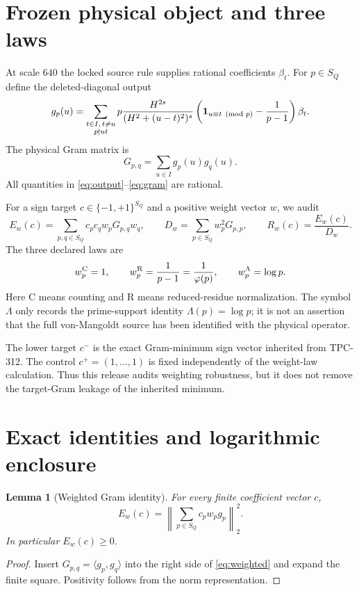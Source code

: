 \documentclass[10pt,a4paper]{article}
\newtheorem{lemma}{Lemma}
\begin{document}
\section{Frozen physical object and three laws}

At scale $640$ the locked source rule supplies rational coefficients
$\beta_t$.  For $p\in S_Q$ define the deleted-diagonal output
\begin{equation}
 g_p(u)=\sum_{\substack{t\in I,\, t\ne u\\p\nmid ut}}
 p\frac{H^{2s}}{(H^2+(u-t)^2)^s}
 \left({\bf1}_{u\equiv t\pmod p}-\frac1{p-1}\right)\beta_t.
 \label{eq:output}
\end{equation}
The physical Gram matrix is
\begin{equation}
 G_{p,q}=\sum_{u\in I}g_p(u)g_q(u).
 \label{eq:gram}
\end{equation}
All quantities in \eqref{eq:output}--\eqref{eq:gram} are rational.

For a sign target $c\in\{-1,+1\}^{S_Q}$ and a positive weight vector $w$,
we audit
\begin{equation}
 E_w(c)=\sum_{p,q\in S_Q}c_pc_qw_pG_{p,q}w_q,
 \qquad
 D_w=\sum_{p\in S_Q}w_p^2G_{p,p},
 \qquad R_w(c)=\frac{E_w(c)}{D_w}.
 \label{eq:weighted}
\end{equation}
The three declared laws are
\begin{equation}
 w_p^{\rm C}=1,\qquad
 w_p^{\rm R}=\frac1{p-1}=\frac1{\varphi(p)},\qquad
 w_p^{\Lambda}=\log p.
 \label{eq:laws}
\end{equation}
Here C means counting and R means reduced-residue normalization.  The symbol
$\Lambda$ only records the prime-support identity $\Lambda(p)=\log p$; it is
not an assertion that the full von-Mangoldt source has been identified with
the physical operator.

The lower target $c^-$ is the exact Gram-minimum sign vector inherited from
TPC-312.  The control $c^+=(1,\ldots,1)$ is fixed independently of the
weight-law calculation.  Thus this release audits weighting robustness, but
it does not remove the target-Gram leakage of the inherited minimum.

\section{Exact identities and logarithmic enclosure}

\begin{lemma}[Weighted Gram identity]
For every finite coefficient vector $c$,
\begin{equation}
 E_w(c)=\left\|\sum_{p\in S_Q}c_pw_pg_p\right\|_2^2.
 \label{eq:psd}
\end{equation}
In particular $E_w(c)\geq0$.
\end{lemma}
\begin{proof}
Insert $G_{p,q}=\langle g_p,g_q\rangle$ into the right side of
\eqref{eq:weighted} and expand the finite square.  Positivity follows from
the norm representation.
\end{proof}
\end{document}
